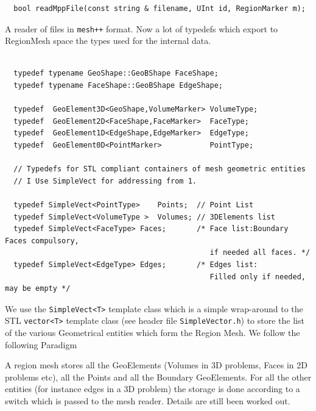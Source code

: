 \begin{verbatim}
  bool readMppFile(const string & filename, UInt id, RegionMarker m);
\end{verbatim}
A reader of files in \texttt{mesh++} format.  Now a lot of typedefs
which export to RegionMesh space the types used for the internal data.
\begin{verbatim}

  typedef typename GeoShape::GeoBShape FaceShape;
  typedef typename FaceShape::GeoBShape EdgeShape;
  
  typedef  GeoElement3D<GeoShape,VolumeMarker> VolumeType;
  typedef  GeoElement2D<FaceShape,FaceMarker>  FaceType;
  typedef  GeoElement1D<EdgeShape,EdgeMarker>  EdgeType;
  typedef  GeoElement0D<PointMarker>           PointType; 

  // Typedefs for STL compliant containers of mesh geometric entities
  // I Use SimpleVect for addressing from 1.

  typedef SimpleVect<PointType>    Points;  // Point List
  typedef SimpleVect<VolumeType >  Volumes; // 3DElements list
  typedef SimpleVect<FaceType> Faces;       /* Face list:Boundary Faces compulsory,
                                               if needed all faces. */
  typedef SimpleVect<EdgeType> Edges;       /* Edges list:
                                               Filled only if needed, may be empty */
\end{verbatim}  
We use the \texttt{SimpleVect<T>} template class which is a simple
wrap-around to the STL \texttt{vector<T>} template class (see header file
\texttt{SimpleVector.h}) to store the list of the various 
Geometrical entities which form the Region Mesh. We follow the following Paradigm
\begin{description}
\item A region mesh stores all the GeoElements (Volumes in 3D
  problems, Faces in 2D problems etc), all the Points and all the
  Boundary GeoElements. For all the other entities (for instance edges
  in a 3D problem) the storage is done according to a switch which is
  passed to the mesh reader.  Details are still been worked out.
\end{description}

